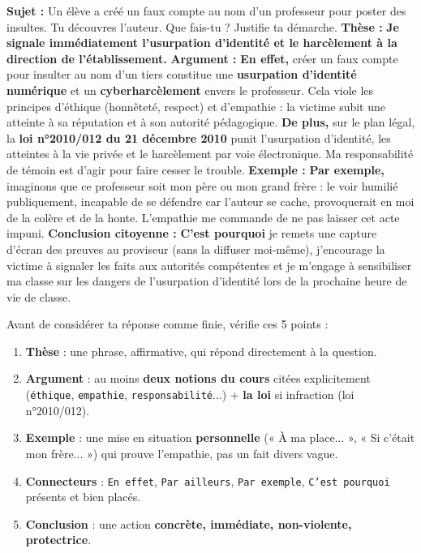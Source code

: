 \documentclass[11pt]{article}
\newcommand{\cle}[1]{{\popxbold\color{popdark}#1}}
\begin{document}
\begin{exoresolu}
\noindent\textbf{Sujet :} Un élève a créé un faux compte au nom d'un professeur pour poster des insultes. Tu découvres l'auteur. Que fais-tu ? Justifie ta démarche.
\tcblower
\noindent\textbf{Thèse :} \textbf{Je signale immédiatement l'usurpation d'identité et le harcèlement à la direction de l'établissement.}
\smallskip
\noindent\textbf{Argument :} \textbf{En effet,} créer un faux compte pour insulter au nom d'un tiers constitue une \textbf{usurpation d'identité numérique} et un \textbf{cyberharcèlement} envers le professeur. Cela viole les principes d'\cle{éthique} (honnêteté, respect) et d'\cle{empathie} : la victime subit une atteinte à sa \cle{réputation} et à son \cle{autorité} pédagogique. \textbf{De plus,} sur le plan légal, la \textbf{loi n°2010/012 du 21 décembre 2010} punit l'usurpation d'identité, les atteintes à la vie privée et le harcèlement par voie électronique. Ma \cle{responsabilité} de témoin est d'agir pour faire cesser le trouble.
\smallskip
\noindent\textbf{Exemple :} \textbf{Par exemple,} imaginons que ce professeur soit mon père ou mon grand frère : le voir humilié publiquement, incapable de se défendre car l'auteur se cache, provoquerait en moi de la colère et de la honte. L'\cle{empathie} me commande de ne pas laisser cet acte impuni.
\smallskip
\noindent\textbf{Conclusion citoyenne :} \textbf{C'est pourquoi} je remets une capture d'écran des preuves au proviseur (sans la diffuser moi-même), j'encourage la victime à signaler les faits aux autorités compétentes et je m'engage à sensibiliser ma classe sur les dangers de l'usurpation d'identité lors de la prochaine heure de vie de classe.
\end{exoresolu}

\begin{aretenir}
\noindent Avant de considérer ta réponse comme finie, vérifie ces 5 points :
\begin{enumerate}
    \item \textbf{Thèse} : une phrase, affirmative, qui répond directement à la question.
    \item \textbf{Argument} : au moins \textbf{deux notions du cours} citées explicitement (\texttt{éthique}, \texttt{empathie}, \texttt{responsabilité}...) + \textbf{la loi} si infraction (loi n°2010/012).
    \item \textbf{Exemple} : une mise en situation \textbf{personnelle} (« À ma place... », « Si c'était mon frère... ») qui prouve l'\cle{empathie}, pas un fait divers vague.
    \item \textbf{Connecteurs} : \texttt{En effet}, \texttt{Par ailleurs}, \texttt{Par exemple}, \texttt{C'est pourquoi} présents et bien placés.
    \item \textbf{Conclusion} : une action \textbf{concrète, immédiate, non-violente, protectrice}.
\end{enumerate}
\end{aretenir}
\end{document}
